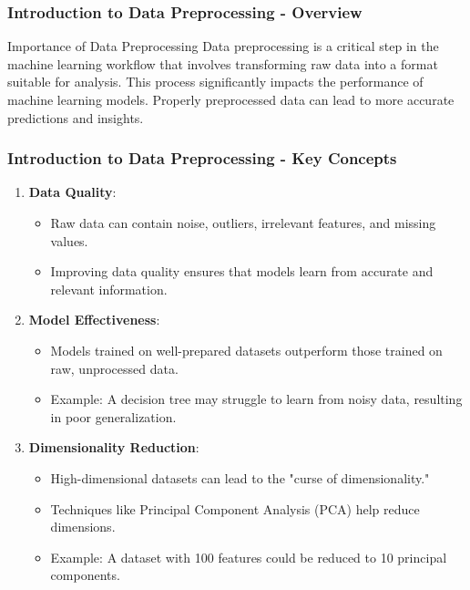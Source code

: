 \documentclass[aspectratio=169]{beamer}
\begin{document}
\frame{\titlepage}

\begin{frame}[fragile]
    \frametitle{Introduction to Data Preprocessing - Overview}
    \begin{block}{Importance of Data Preprocessing}
        Data preprocessing is a critical step in the machine learning workflow that involves transforming raw data into a format suitable for analysis. This process significantly impacts the performance of machine learning models. Properly preprocessed data can lead to more accurate predictions and insights.
    \end{block}
\end{frame}

\begin{frame}[fragile]
    \frametitle{Introduction to Data Preprocessing - Key Concepts}
    \begin{enumerate}
        \item \textbf{Data Quality}:
        \begin{itemize}
            \item Raw data can contain noise, outliers, irrelevant features, and missing values.
            \item Improving data quality ensures that models learn from accurate and relevant information.
        \end{itemize}
        
        \item \textbf{Model Effectiveness}:
        \begin{itemize}
            \item Models trained on well-prepared datasets outperform those trained on raw, unprocessed data.
            \item Example: A decision tree may struggle to learn from noisy data, resulting in poor generalization.
        \end{itemize}
        
        \item \textbf{Dimensionality Reduction}:
        \begin{itemize}
            \item High-dimensional datasets can lead to the "curse of dimensionality."
            \item Techniques like Principal Component Analysis (PCA) help reduce dimensions.
            \item Example: A dataset with 100 features could be reduced to 10 principal components.
        \end{itemize}
    \end{enumerate}
\end{frame}
\end{document}
